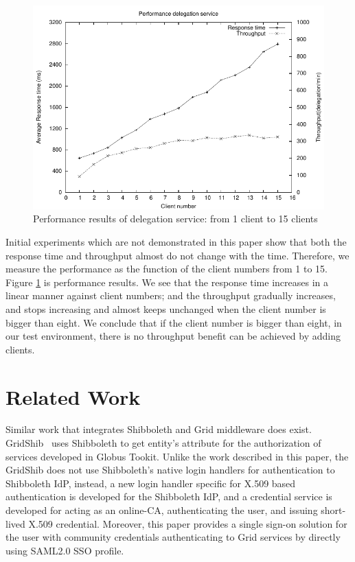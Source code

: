 \documentclass[conference]{IEEEtran}
\begin{document}
\begin{figure}
\includegraphics[width=0.9\columnwidth]{Delegation_thread_to_perf.pdf}
\caption{Performance results of delegation service: from 1 client to 15 clients}
\label{fig:Deleg}
\end{figure}

Initial experiments which are not demonstrated in this paper show that both the response time and
throughput almost do not change with the time. Therefore, we measure the performance as the function 
of the client numbers from 1 to 15. Figure \ref{fig:Deleg} is performance results. We see that 
the response time increases in a linear manner against client numbers; and the throughput gradually 
increases, and stops increasing and almost keeps unchanged when the client number is bigger than eight.
We conclude that if the client number is bigger than eight, in our test environment, there is no 
throughput benefit can be achieved by adding clients.


\section{Related Work}
\label{sec:relatedwork}
Similar work that integrates Shibboleth and Grid middleware does exist. GridShib~\cite{VWelch05,TBarton06} uses Shibboleth to get entity's attribute for the authorization of services developed in Globus Tookit. Unlike the work described in this paper, the GridShib does not use Shibboleth's native login handlers for authentication to Shibboleth IdP, instead, a new login handler specific for X.509 based authentication is developed for the Shibboleth IdP, and a credential service is developed for acting as an online-CA, authenticating the user, and issuing short-lived X.509 credential. Moreover, this paper provides a single sign-on solution for the user with community credentials authenticating to Grid services by directly using SAML2.0 SSO profile.
\end{document}
